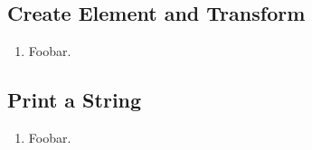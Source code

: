 \subsection{Create Element and Transform}

\begin{enumerate}
  \item Foobar. %
\end{enumerate}

\subsection{Print a String}

\begin{enumerate}
  \item Foobar. %
\end{enumerate}
